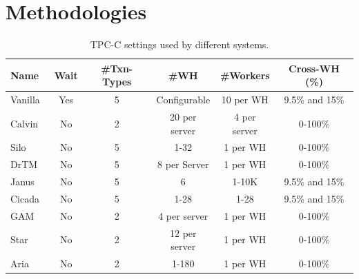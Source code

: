 \section{Methodologies}



\begin{table}[t]
\centering
\begin{tabular}{lccccc}
        Name  &   Wait & \#Txn-Types & \#WH & \#Workers & Cross-WH (\%) \\
    \toprule
        Vanilla~\cite{tpccurl} & Yes & 5 & Configurable & 10 per WH & 9.5\% and 15\%   \\
    \midrule
        Calvin~\cite{Thomson2012Calvin,ren2014evaluation,calvin-repo}   &  No  &  2   & 20 per server & 4 per server   & 0-100\%   \\
        Silo~\cite{Tu2013Silo,siloSRC}       &  No  &   5  & 1-32 & 1 per WH &  0-100\%   \\
        DrTM~\cite{Wei2015FIT, DrTMSRC}           &  No    &   5   &  8 per Server  &  1 per WH   &  0-100\%          \\
        Janus~\cite{Mu2016Consolidating,janusSRC}    & No  &  5 & 6 & 1-10K   &  9.5\% and 15\%        \\
        Cicada~\cite{Lim2017Cicada,cicadaSRC}     & No &  5    &  1-28  & 1-28 &   9.5\% and 15\%       \\
        GAM~\cite{Cai2018GAM, GamSRC}                &   No   &  2    &  4 per server  & 1 per WH    &  0-100\%          \\
        Star~\cite{Lu2019Star, StarSRC}       &  No  &  2 & 12 per server & 1 per WH & 0-100\%   \\
        Aria~\cite{Lu2020Aria,ariaSRC}        & No    &  2    &  1-180 &   1 per WH   & 0-100\%   \\
    \bottomrule
\end{tabular}
\caption{TPC-C settings used by different systems.}
\label{tab:tpcc}
\end{table}


